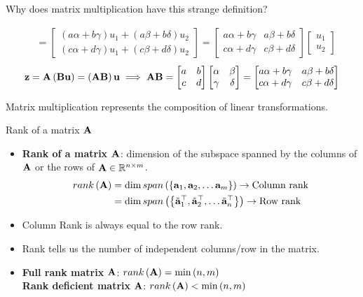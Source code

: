 \documentclass[aspectratio=169]{beamer}
\let\olditem\item
\renewcommand{\item}{\setlength{\itemsep}{\fill}\olditem}
\def\mf{\ensuremath\mathbf}
\def\mb{\ensuremath\mathbb}
\def\lp{\ensuremath\left(}
\def\rp{\ensuremath\right)}
\def\lc{\ensuremath\left\{}
\def\rc{\ensuremath\right\}}
\begin{document}
\begin{frame}[t]{Why does matrix multiplication have this strange definition?}
\begin{small}
\[\begin{split}
  &= \begin{bmatrix}\left(a\alpha + b\gamma\right) u_1 + \left(a\beta + b\delta\right)u_2 \\ \left(c\alpha + d\gamma\right)u_1  + \left(c\beta + d\delta\right)u_2 \end{bmatrix} = \begin{bmatrix}a\alpha + b\gamma & a\beta + b\delta \\ c\alpha + d\gamma & c\beta + d\delta \end{bmatrix} \begin{bmatrix}u_1 \\ u_2 \end{bmatrix}
  \end{split}
  \]
  \[\mf{z} = \mf{A}\lp\mf{B}\mf{u}\rp = \lp\mf{A}\mf{B}\rp\mf{u} \implies \mf{A}\mf{B} = \begin{bmatrix}a & b \\ c & d\end{bmatrix}\begin{bmatrix}\alpha & \beta \\ \gamma & \delta\end{bmatrix} = \begin{bmatrix}a\alpha + b\gamma & a\beta + b\delta \\ c\alpha + d\gamma & c\beta + d\delta \end{bmatrix}
  \]
  \end{small}
  Matrix multiplication represents the composition of linear transformations.
\end{frame}


\begin{frame}[t]{Rank of a matrix $\mf{A}$}
  \begin{itemize}
  \item \textbf{Rank of a matrix $\mf{A}$}: dimension of the subspace spanned by the columns of $\mf{A}$ or the rows of $\mf{A} \in \mb{R}^{n \times m}$. 
  \[ \begin{split} 
  rank\lp \mf{A} \rp &= \mathrm{dim} \, span\lp \lc \mf{a}_1, \mf{a}_2, \ldots \mf{a}_m \rc \rp \rightarrow \text{Column rank}\\ 
  &= \mathrm{dim} \, span\lp \lc \tilde{\mf{a}}_1^\top, \tilde{\mf{a}}_2^\top, \ldots \tilde{\mf{a}}_n^\top \rc \rp \rightarrow \text{Row rank}
  \end{split}
  \]
  
  \item Column Rank is always equal to the row rank.
  
  \item Rank tells us the number of independent columns/row in the matrix.
  
  \item \textbf{Full rank matrix } $\mf{A}$: $rank\lp \mf{A} \rp  = \min\lp n, m\rp$\\
        \textbf{Rank deficient matrix } $\mf{A}$: $rank\lp \mf{A} \rp  < \min\lp n, m\rp$
  \end{itemize}
  \end{frame}
    
\end{document}
